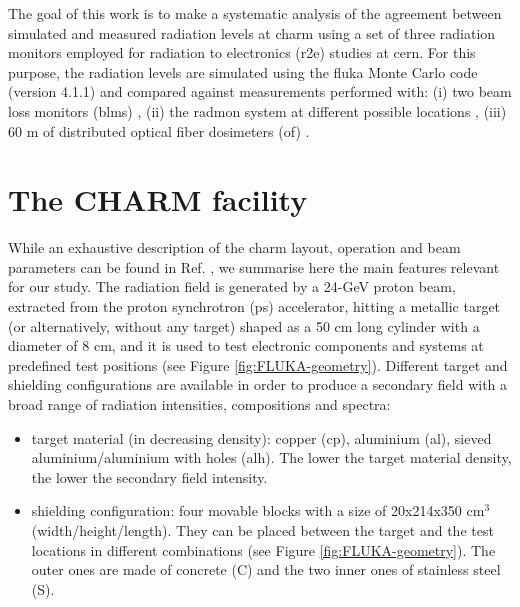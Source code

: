 \documentclass[encoding=utf8,british]{tumphthesis}
\begin{document}
The goal of this work is to make a systematic analysis of the agreement between simulated and measured radiation levels at \acrshort{charm} using a set of three radiation monitors employed for radiation to electronics (\acrshort{r2e}) studies at \acrshort{cern}. For this purpose, the radiation levels  are simulated using the \acrshort{fluka} Monte Carlo code (version 4.1.1) and compared against measurements performed with: (i) two beam loss monitors (\acrshort{blm}s) \cite{BLM:description}, (ii) the \acrshort{radmon} system at different possible locations \cite{description:RadMON}, (iii) 60 m of distributed optical fiber dosimeters  (\acrshort{of}) \cite{Diego:OF}. 

\section{The CHARM facility}
While an exhaustive description of the \acrshort{charm} layout, operation and beam parameters can be found in Ref. \cite{Mekki:2016tbj}, we summarise here the main features relevant for our study. The radiation field is generated by a 24-GeV proton beam, extracted from the proton synchrotron (\acrshort{ps}) accelerator, hitting a metallic target (or alternatively, without any target) shaped as a 50 cm long cylinder with a diameter of 8 cm, and it is used to test electronic components and systems at predefined test positions (see Figure \ref{fig:FLUKA-geometry}). Different target and shielding configurations are available in order to produce a secondary field with a broad range of radiation intensities, compositions and spectra:


\begin{itemize}
    \item target material (in decreasing density): copper (cp), aluminium (al), sieved aluminium/aluminium with holes (alh). The lower the target material density, the lower the secondary field intensity.
    \item shielding configuration: four movable blocks with a size of 20x214x350 cm$^3$ (width/height/length). They can be placed between the target and the test locations in different combinations (see Figure \ref{fig:FLUKA-geometry}). The outer ones are made of concrete (C) and the two inner ones of stainless steel (S). 
\end{itemize}
\end{document}
